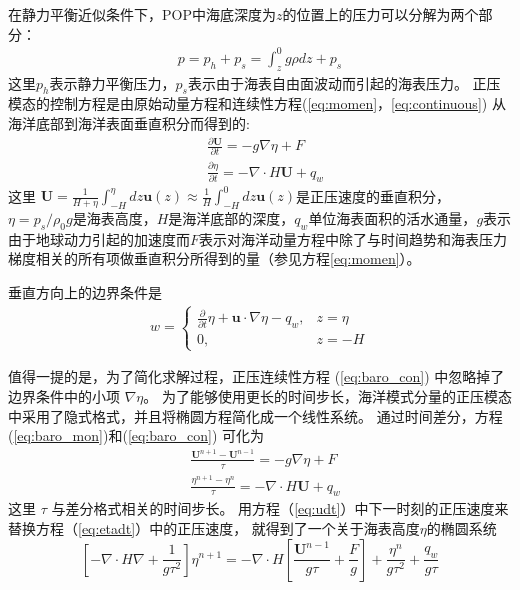   
在静力平衡近似条件下，POP中海底深度为$z$的位置上的压力可以分解为两个部分：  
\begin{align}
\displaystyle p = p_h + p_s = \int^0_z g\rho dz +p_s
\end{align}
这里$p_h$表示静力平衡压力，$p_s$表示由于海表自由面波动而引起的海表压力。 
正压模态的控制方程是由原始动量方程和连续性方程(\ref{eq:momen}，\ref{eq:continuous}) 从海洋底部到海洋表面垂直积分而得到的:
\begin{align}
&\displaystyle \frac{\partial \textbf{U} }{\partial t}  = -g \nabla \eta + F  \label{eq:baro_mon}\\
&\displaystyle \frac{\partial \eta }{\partial t} = - \nabla \cdot H\textbf{U} + q_w  \label{eq:baro_con}
\end{align}
这里  $\textbf{U} =  \frac{1}{H+\eta}\int_{-H}^\eta dz \textbf{u}(z) \approx \frac{1}{H }\int_{-H}^0 dz \textbf{u}(z)$是正压速度的垂直积分，
$\eta = p_s/{\rho_0g}$是海表高度，$H$是海洋底部的深度，$q_w$单位海表面积的活水通量，$g$表示由于地球动力引起的加速度而$F$表示对海洋动量方程中除了与时间趋势和海表压力梯度相关的所有项做垂直积分所得到的量（参见方程\ref{eq:momen}）。
 
垂直方向上的边界条件是
\begin{align}
\label{eq:bound_w}
w = \left\{ \begin{array}{ll}
\frac{\partial}{\partial t} \eta  +\textbf{u}\cdot\nabla \eta - q_w, & z = \eta  \\
0, & z = -H
\end{array} \right.
\end{align}
 
值得一提的是，为了简化求解过程，正压连续性方程 (\ref{eq:baro_con}) 中忽略掉了边界条件中的小项 $\nabla \eta$\cite{smith2010parallel}。
为了能够使用更长的时间步长，海洋模式分量的正压模态中采用了隐式格式，并且将椭圆方程简化成一个线性系统。 通过时间差分，方程  (\ref{eq:baro_mon})和(\ref{eq:baro_con}) 可化为
\begin{align}
&\displaystyle \frac{ \textbf{U}^{n+1} - \textbf{U}^{n-1}}{\tau}  = -g \nabla \eta + F \label{eq:udt} \\
&\displaystyle \frac{\eta^{n+1} - \eta^n }{\tau}  = - \nabla \cdot H\textbf{U} + q_w \label{eq:etadt}
\end{align}
这里 $\tau$ 与差分格式相关的时间步长。 
用方程（\ref{eq:udt}）中下一时刻的正压速度来替换方程（\ref{eq:etadt}）中的正压速度， 就得到了一个关于海表高度$\eta$的椭圆系统
\begin{equation}
\label{eq:sshdiscret}
     [-\nabla\cdot H \nabla + \frac{1}{g  \tau^2}]\eta^{n+1}
           = -\nabla\cdot H[\frac{\textbf{U}^{n-1}}{g \tau} + \frac{F}{g}] + \frac{\eta^n}{g\tau^2} +\frac{q_w}{g\tau}
\end{equation}
 
